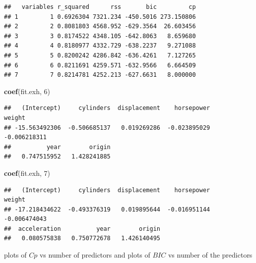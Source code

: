 \documentclass[]{article}
\newenvironment{Shaded}{\begin{snugshade}}{\end{snugshade}}
\newcommand{\KeywordTok}[1]{\textcolor[rgb]{0.13,0.29,0.53}{\textbf{#1}}}
\newcommand{\DataTypeTok}[1]{\textcolor[rgb]{0.13,0.29,0.53}{#1}}
\newcommand{\DecValTok}[1]{\textcolor[rgb]{0.00,0.00,0.81}{#1}}
\newcommand{\StringTok}[1]{\textcolor[rgb]{0.31,0.60,0.02}{#1}}
\newcommand{\OperatorTok}[1]{\textcolor[rgb]{0.81,0.36,0.00}{\textbf{#1}}}
\newcommand{\NormalTok}[1]{#1}
\begin{document}
\begin{verbatim}
##   variables r_squared      rss       bic         cp
## 1         1 0.6926304 7321.234 -450.5016 273.150806
## 2         2 0.8081803 4568.952 -629.3564  26.603456
## 3         3 0.8174522 4348.105 -642.8063   8.659680
## 4         4 0.8180977 4332.729 -638.2237   9.271088
## 5         5 0.8200242 4286.842 -636.4261   7.127265
## 6         6 0.8211691 4259.571 -632.9566   6.664509
## 7         7 0.8214781 4252.213 -627.6631   8.000000
\end{verbatim}

\begin{Shaded}
\begin{Highlighting}[]
\KeywordTok{coef}\NormalTok{(fit.exh, }\DecValTok{6}\NormalTok{)}
\end{Highlighting}
\end{Shaded}

\begin{verbatim}
##   (Intercept)     cylinders  displacement    horsepower        weight 
## -15.563492306  -0.506685137   0.019269286  -0.023895029  -0.006218311 
##          year        origin 
##   0.747515952   1.428241885
\end{verbatim}

\begin{Shaded}
\begin{Highlighting}[]
\KeywordTok{coef}\NormalTok{(fit.exh, }\DecValTok{7}\NormalTok{)}
\end{Highlighting}
\end{Shaded}

\begin{verbatim}
##   (Intercept)     cylinders  displacement    horsepower        weight 
## -17.218434622  -0.493376319   0.019895644  -0.016951144  -0.006474043 
##  acceleration          year        origin 
##   0.080575838   0.750772678   1.426140495
\end{verbatim}

plots of \(Cp\) vs number of predictors and plots of \(BIC\) vs number
of the predictors

\begin{Shaded}
\end{Shaded}
\end{document}
